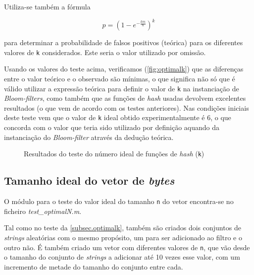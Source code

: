 \documentclass[a4paper,11pt,openright,oneside]{report}
\begin{document}
Utiliza-se também a fórmula

$$ p =  \left(1 - e^{-\frac{km}{n}}\right)^k $$

para determinar a probabilidade de falsos positivos (teórica) para os diferentes valores de \texttt{k} considerados. Este seria o valor utilizado por omissão.

Usando os valores do teste acima, verificamos (\autoref{fig:optimalk}) que as diferenças entre o valor teórico e o observado são mínimas, o que significa não só que é válido utilizar a expressão teórica para definir o valor de \texttt{k} na instanciação de \textit{Bloom-filters}, como também que as funções de \textit{hash} usadas devolvem excelentes resultados (o que vem de acordo com os testes anteriores). Nas condições iniciais deste teste vem que o valor de \texttt{k} ideal obtido experimentalmente é 6, o que concorda com o valor que teria sido utilizado por definição aquando da instanciação do \textit{Bloom-filter} através da dedução teórica.

\begin{figure}[ht]
\center
{}
\caption{Resultados do teste do número ideal de funções de \textit{hash} (\texttt{k})}
\label{fig:optimalk}
\end{figure}

\subsection{Tamanho ideal do vetor de \textit{bytes}}
\label{subsec.optimaln}

O módulo para o teste do valor ideal do tamanho \texttt{n} do vetor encontra-se no ficheiro \textit{test\_optimalN.m}.

Tal como no teste da \autoref{subsec.optimalk}, também são criados dois conjuntos de \textit{strings} aleatórias com o mesmo propósito, um para ser adicionado ao filtro e o outro não. É também criado um vetor com diferentes valores de \texttt{n}, que vão desde o tamanho do conjunto de \textit{strings} a adicionar até 10 vezes esse valor, com um incremento de metade do tamanho do conjunto entre cada.
\end{document}
